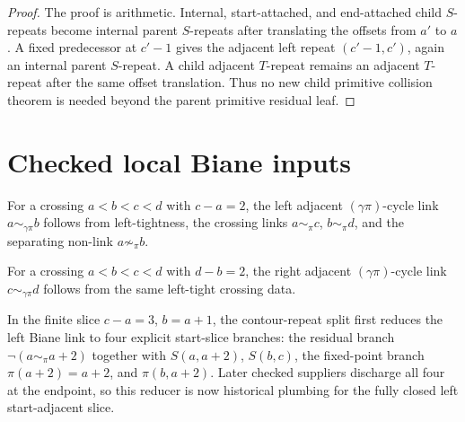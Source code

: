 \begin{proof}
  \leanok
  The proof is arithmetic.  Internal, start-attached, and end-attached child
  \(S\)-repeats become internal parent \(S\)-repeats after translating the
  offsets from \(a'\) to \(a\).  A fixed predecessor at \(c'-1\) gives the
  adjacent left repeat \((c'-1,c')\), again an internal parent \(S\)-repeat.
  A child adjacent \(T\)-repeat remains an adjacent \(T\)-repeat after the same
  offset translation.  Thus no new child primitive collision theorem is
  needed beyond the parent primitive residual leaf.
\end{proof}

\section{Checked local Biane inputs}

\begin{theorem}
  \label{thm:gap-two-biane-left}
  \leanok
  For a crossing \(a<b<c<d\) with \(c-a=2\), the left adjacent
  \((\gamma\pi)\)-cycle link \(a\sim_{\gamma\pi} b\) follows from
  left-tightness, the crossing links \(a\sim_\pi c\), \(b\sim_\pi d\), and the
  separating non-link \(a\not\sim_\pi b\).
\end{theorem}

\begin{theorem}
  \label{thm:gap-two-biane-right}
  \leanok
  For a crossing \(a<b<c<d\) with \(d-b=2\), the right adjacent
  \((\gamma\pi)\)-cycle link \(c\sim_{\gamma\pi} d\) follows from the same
  left-tight crossing data.
\end{theorem}

\begin{theorem}
  \label{thm:left-gap-three-reduction}
  \leanok
  In the finite slice \(c-a=3\), \(b=a+1\), the contour-repeat split first
  reduces the left Biane link to four explicit start-slice branches:
  the residual branch \(\neg(a\sim_\pi a+2)\) together with \(S(a,a+2)\),
  \(S(b,c)\), the fixed-point branch \(\pi(a+2)=a+2\), and \(\pi(b,a+2)\).
  Later checked suppliers discharge all four at the endpoint, so this reducer
  is now historical plumbing for the fully closed left start-adjacent slice.
\end{theorem}


